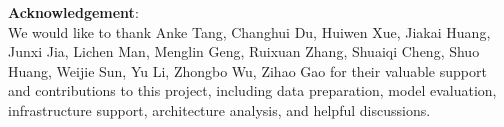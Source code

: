 \documentclass[11pt]{academic_template}
\theoremstyle{definition}
\begin{document}
\textbf{Acknowledgement}: \\
We would like to thank Anke Tang, Changhui Du, Huiwen Xue, Jiakai Huang, Junxi Jia, Lichen Man, Menglin Geng, Ruixuan Zhang, Shuaiqi Cheng, Shuo Huang, Weijie Sun, Yu Li, Zhongbo Wu, Zihao Gao for their valuable support and contributions to this project, including data preparation, model evaluation, infrastructure support, architecture analysis, and helpful discussions.




\newpage

\end{document}

